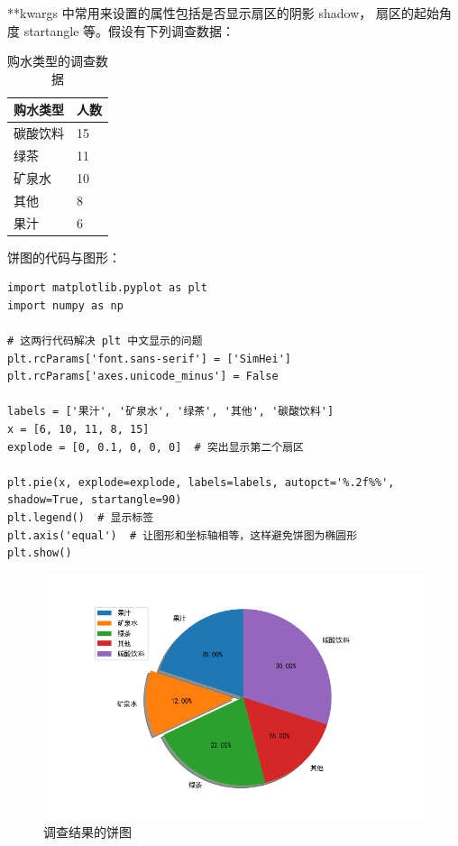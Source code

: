 **kwargs 中常用来设置的属性包括是否显示扇区的阴影 shadow， 扇区的起始角度 startangle 等。假设有下列调查数据：

\begin{table}[!ht]
\centering
\renewcommand{\arraystretch}{1.2}
\caption{购水类型的调查数据}
\begin{tabular}{|l|l|}
\hline

购水类型 & 人数 \\ \hline
碳酸饮料 & 15 \\ \hline
绿茶 & 11 \\ \hline
矿泉水 & 10 \\ \hline
其他 & 8 \\ \hline
果汁 & 6 \\ \hline

\end{tabular}
\end{table}

饼图的代码与图形：

\begin{lstlisting}[Language=Python]
import matplotlib.pyplot as plt
import numpy as np

# 这两行代码解决 plt 中文显示的问题
plt.rcParams['font.sans-serif'] = ['SimHei']
plt.rcParams['axes.unicode_minus'] = False

labels = ['果汁', '矿泉水', '绿茶', '其他', '碳酸饮料']
x = [6, 10, 11, 8, 15]
explode = [0, 0.1, 0, 0, 0]  # 突出显示第二个扇区

plt.pie(x, explode=explode, labels=labels, autopct='%.2f%%', shadow=True, startangle=90)
plt.legend()  # 显示标签
plt.axis('equal')  # 让图形和坐标轴相等，这样避免饼图为椭圆形
plt.show()
\end{lstlisting}

\begin{figure}[!ht]
  \centering
  \includegraphics[scale=0.7]{figure/pie1.png}
  \caption{调查结果的饼图}\label{fig:pie}
\end{figure}

